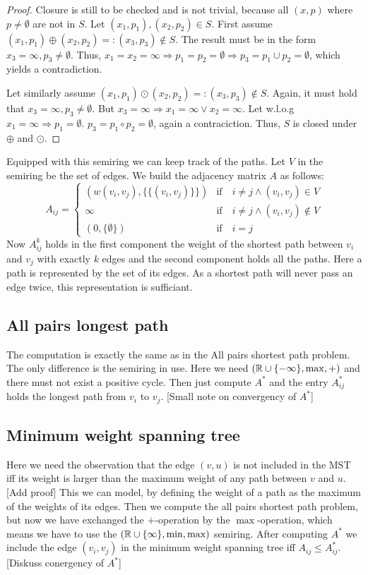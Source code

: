 \begin{proof}
    Closure is still to be checked and is not trivial, because all $(x, p)$ where $p \neq \emptyset$ are not in $S$. Let $(x_1, p_1), (x_2, p_2) \in S$. First assume $(x_1, p_1) \oplus (x_2, p_2) =: (x_3, p_3) \notin S$. The result must be in the form $x_3 = \infty, p_3 \neq \emptyset$. Thus, $x_1 = x_2 = \infty \Rightarrow p_1 = p_2 = \emptyset \Rightarrow p_3 = p_1 \cup p_2 = \emptyset$, which yields a contradiction.

    Let similarly assume $(x_1, p_1) \odot (x_2, p_2) =: (x_3, p_3) \notin S$. Again, it must hold that $x_3 = \infty, p_3 \neq \emptyset$. But $x_3 = \infty \Rightarrow x_1 = \infty \lor x_2 = \infty$. Let w.l.o.g $x_1 = \infty \Rightarrow p_1 = \emptyset$. $p_3 = p_1 \circ p_2 = \emptyset$, again a contraciction. Thus, $S$ is closed under $\oplus$ and $\odot$.
\end{proof}
Equipped with this semiring we can keep track of the paths. Let $V$ in the semiring be the set of edges. We build the adjacency matrix $A$ as follows:
$$A_{ij} = \begin{cases}
    (w(v_i, v_j), \{\{(v_i, v_j)\}\}) &\textrm{if}\quad i \neq j \land (v_i, v_j) \in V\\
    \infty &\textrm{if}\quad i \neq j \land (v_i, v_j) \notin V\\
    (0, \{\emptyset\}) &\textrm{if}\quad i = j
\end{cases}$$
Now $A^k_{ij}$ holds in the first component the weight of the shortest path between $v_i$ and $v_j$ with exactly $k$ edges and the second component holds all the paths. Here a path is represented by the set of its edges. As a shortest path will never pass an edge twice, this representation is sufficiant. 

\subsection{All pairs longest path}
The computation is exactly the same as in the All pairs shortest path problem. The only difference is the semiring in use. Here we need $(\mathbb{R} \cup \{-\infty\}, \max, +)$ and there must not exist a positive cycle. Then just compute $A^*$ and the entry $A^*_{ij}$ holds the longest path from $v_i$ to $v_j$. [Small note on convergency of $A^*$]

\subsection{Minimum weight spanning tree}
Here we need the observation that the edge $(v, u)$ is not included in the MST iff its weight is larger than the maximum weight of any path between $v$ and $u$. [Add proof] This we can model, by defining the weight of a path as the maximum of the weights of its edges. Then we compute the all pairs shortest path problem, but now we have exchanged the $+$-operation by the $\max$-operation, which means we have to use the $(\mathbb{R} \cup\{\infty\}, \min, \max)$ semiring. After computing $A^*$ we include the edge $(v_i, v_j)$ in the minimum weight spanning tree iff $A_{ij} \leq A^*_{ij}$.
[Diskuss conergency of $A^*$]

